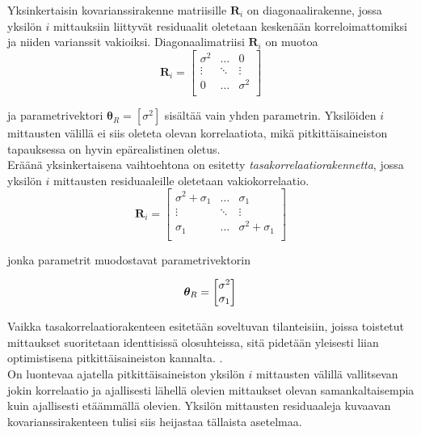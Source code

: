 \documentclass[finnish]{docopts}
\begin{document}
Yksinkertaisin kovarianssirakenne matriisille $\bm{R}_i$ on diagonaalirakenne, jossa yksilön $i$ mittauksiin liittyvät residuaalit oletetaan keskenään korreloimattomiksi ja niiden varianssit vakioiksi. Diagonaalimatriisi $\bm{R}_i$ on muotoa\\

$$
\bm{R}_i =
\begin{bmatrix}
\sigma^2 & \dots & 0 \\
\vdots & \ddots & \vdots \\
0 & \dots & \sigma^2 \\
\end{bmatrix}
$$

ja parametrivektori $\bm{\theta}_R = [\sigma^2]$ sisältää vain yhden parametrin. Yksilöiden $i$ mittausten välillä ei siis oleteta olevan korrelaatiota, mikä pitkittäisaineiston tapauksessa on hyvin epärealistinen oletus. \\

Eräänä yksinkertaisena vaihtoehtona on esitetty \textit{tasakorrelaatiorakennetta}, jossa yksilön $i$ mittausten residuaaleille oletetaan vakiokorrelaatio. \\

$$
\bm{R}_i =
\begin{bmatrix}
\sigma^2 + \sigma_1 & \dots & \sigma_1 \\
\vdots & \ddots & \vdots \\
\sigma_1 & \dots & \sigma^2 + \sigma_1 \\
\end{bmatrix}
$$

jonka parametrit muodostavat parametrivektorin

$$
\bm{\theta}_R =
\begin{bmatrix}
\sigma^2\\
\sigma_1 \\
\end{bmatrix}\\
$$

Vaikka tasakorrelaatiorakenteen esitetään soveltuvan tilanteisiin, joissa toistetut mittaukset suoritetaan identtisissä olosuhteissa, sitä pidetään yleisesti liian optimistisena pitkittäisaineiston kannalta. \citep{pinheiro00, fitzmaurice11, west14}.\\

On luontevaa ajatella pitkittäisaineiston yksilön $i$ mittausten välillä vallitsevan jokin korrelaatio ja ajallisesti lähellä olevien mittaukset olevan samankaltaisempia kuin ajallisesti etäämmällä olevien. Yksilön mittausten residuaaleja kuvaavan kovarianssirakenteen tulisi siis heijastaa tällaista asetelmaa.\\
\end{document}
